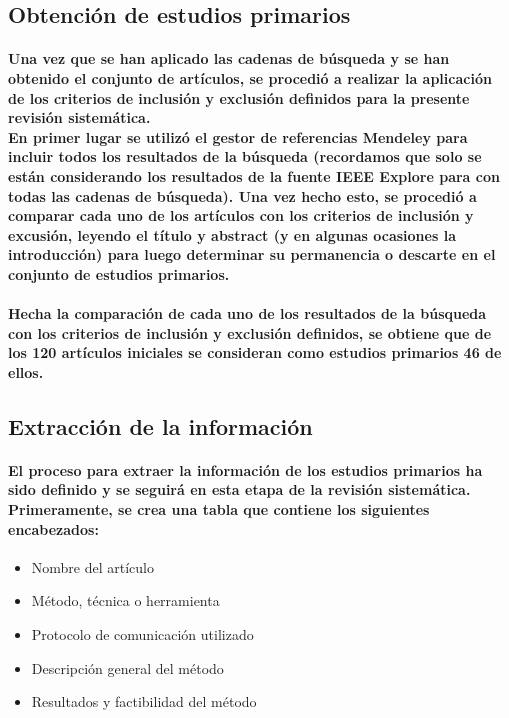 \documentclass[10pt, twocolumn]{article}
\begin{document}
\subsection{Obtención de estudios primarios}
\paragraph{Una vez que se han aplicado las cadenas de búsqueda y se han obtenido el conjunto de artículos, se procedió a realizar la aplicación de los criterios de inclusión y exclusión definidos para la presente revisión sistemática. \\ En primer lugar se utilizó el gestor de referencias Mendeley para incluir todos los resultados de la búsqueda (recordamos que solo se están considerando los resultados de la fuente IEEE Explore para con todas las cadenas de búsqueda). Una vez hecho esto, se procedió a comparar cada uno de los artículos con los criterios de inclusión y excusión, leyendo el título y abstract (y en algunas ocasiones la introducción) para luego determinar su permanencia o descarte en el conjunto de estudios primarios.}

\paragraph{Hecha la comparación de cada uno de los resultados de la búsqueda con los criterios de inclusión y exclusión definidos, se obtiene que de los 120 artículos iniciales se consideran como estudios primarios 46 de ellos.}

\subsection{Extracción de la información}
\paragraph{El proceso para extraer la información de los estudios primarios ha sido definido y se seguirá en esta etapa de la revisión sistemática. Primeramente, se crea una tabla que contiene los siguientes encabezados:}
\begin{itemize}
	\item{Nombre del artículo}
	\item{Método, técnica o herramienta}
	\item{Protocolo de comunicación utilizado}
	\item{Descripción general del método}
	\item{Resultados y factibilidad del método}
\end{itemize}
\end{document}
